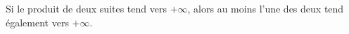 Si le produit de deux suites tend vers $+\infty$, alors au moins l'une des deux tend également vers $+\infty$.

\begin{reponses}
\end{reponses}


